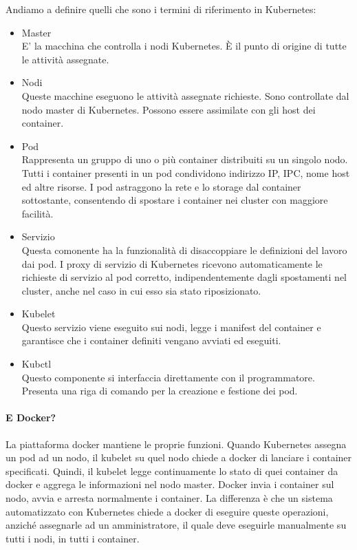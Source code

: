 Andiamo a definire quelli che sono i termini di riferimento in Kubernetes:
\begin{itemize}
	\item Master \\
	E' la macchina che controlla i nodi Kubernetes. È il punto di origine di tutte le attività assegnate.
	\item Nodi \\
	Queste macchine eseguono le attività assegnate richieste. Sono controllate dal nodo master di Kubernetes. Possono essere assimilate con gli host dei container.
	\item Pod \\
	Rappresenta un gruppo di uno o più container distribuiti su un singolo nodo. Tutti i container presenti in un pod condividono indirizzo IP, IPC, nome host ed altre risorse. I pod astraggono la rete e lo storage dal container sottostante, consentendo di spostare i container nei cluster con maggiore facilità.
	\item Servizio \\
	Questa comonente ha la funzionalità di disaccoppiare le definizioni del lavoro dai pod. I proxy di servizio di Kubernetes ricevono automaticamente le richieste di servizio al pod corretto, indipendentemente dagli spostamenti nel cluster, anche nel caso in cui esso sia stato riposizionato.
	\item Kubelet \\
	Questo servizio viene eseguito sui nodi, legge i manifest del container e garantisce che i container definiti vengano avviati ed eseguiti.
	\item Kubctl \\
	Questo componente si interfaccia direttamente con il programmatore. Presenta una riga di comando per la creazione e festione dei pod.
\end{itemize}

\paragraph{E Docker?}
La piattaforma docker mantiene le proprie funzioni. Quando Kubernetes assegna un pod ad un nodo, il kubelet su quel nodo chiede a docker di lanciare i container specificati. Quindi, il kubelet legge continuamente lo stato di quei container da docker e aggrega le informazioni nel nodo master. Docker invia i container sul nodo, avvia e arresta normalmente i container. La differenza è che un sistema automatizzato con Kubernetes chiede a docker di eseguire queste operazioni, anziché assegnarle ad un amministratore, il quale deve eseguirle manualmente su tutti i nodi, in tutti i container.

